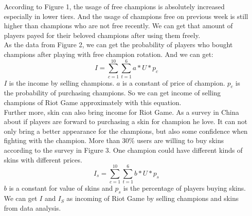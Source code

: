 \documentclass[sigconf]{acmart}
\begin{document}
According to Figure 1, the usage of free champions is absolutely increased especially in lower tiers. And the usage of champions free on previous week is still higher than champions who are not free recently. We can get that amount of players payed for their beloved champions after using them freely. \\

As the data from Figure 2, we can get the probability of players who bought champions after playing with free champion rotation. And we can get:\\
\begin{equation}
    I=\sum_{c=1}^{10}\sum_{t=1}^6a*U*p_c
\end{equation}
$I$ is the income by selling champions. $a$ is a constant of price of champion. $p_c$ is the probability of purchasing champions. So we can get income of selling champions of Riot Game approximately with this equation. \\
Further more, skin can also bring income for Riot Game. As a survey in China about if players are forward to purchasing a skin for champion he love. It can not only bring a better appearance for the champions, but also some confidence when fighting with the champion. More than 30\% users are willing to buy skins according to the survey in Figure 3. One champion could have different kinds of skins with different prices. \\

\begin{equation}
    I_s=\sum_{c=1}^{10}\sum_{t=1}^6b*U*p_s
\end{equation}
$b$ is a constant for value of skins and $p_s$ is the percentage of players buying skins. We can get $I$ and $I_S$ as incoming of Riot Game by selling champions and skins from data analysis.
\end{document}
